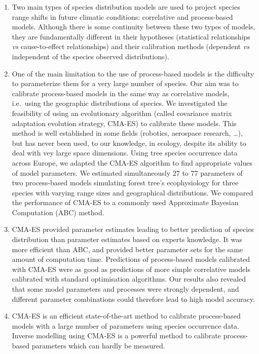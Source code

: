 \documentclass[11pt,]{article}
\renewenvironment{abstract}
 {{%
    \setlength{\leftmargin}{0mm}
    \setlength{\rightmargin}{\leftmargin}%
  }%
  \relax}
 {\endlist}
\begin{document}
\begin{abstract}

    \hbox{\vrule height .2pt width 39.14pc}

    \vskip 8.5pt %

\noindent \begin{enumerate}
\def\labelenumi{\arabic{enumi}.}
\item
  Two main types of species distribution models are used to project
  species range shifts in future climatic conditions: correlative and
  process-based models. Although there is some continuity between these
  two types of models, they are fundamentally different in their
  hypotheses (statistical relationships \emph{vs} cause-to-effect
  relationships) and their calibration methods (dependent \emph{vs}
  independent of the species observed distributions).
\item
  One of the main limitation to the use of process-based models is the
  difficulty to parameterize them for a very large number of species.
  Our aim was to calibrate process-based models in the same way as
  correlative models, i.e.~using the geographic distributions of
  species. We investigated the feasibility of using an evolutionary
  algorithm (called covariance matrix adaptation evolution strategy,
  CMA-ES) to calibrate these models. This method is well established in
  some fields (robotics, aerospace research, \ldots), but has never been
  used, to our knowledge, in ecology, despite its ability to deal with
  vey large space dimensions. Using tree species occurrence data across
  Europe, we adapted the CMA-ES algorithm to find appropriate values of
  model parameters. We estimated simultaneously 27 to 77 parameters of
  two process-based models simulating forest tree's ecophysiology for
  three species with varying range sizes and geographical distributions.
  We compared the performance of CMA-ES to a commonly used Approximate
  Bayesian Computation (ABC) method.
\item
  CMA-ES provided parameter estimates leading to better prediction of
  species distribution than parameter estimates based on experts
  knowledge. It was more efficient than ABC, and provided better
  parameter sets for the same amount of computation time. Predictions of
  process-based models calibrated with CMA-ES were as good as
  predictions of more simple correlative models calibrated with standard
  optimisation algorithms. Our results also revealed that some model
  parameters and processes were strongly dependent, and different
  parameter combinations could therefore lead to high model accuracy.
\item
  CMA-ES is an efficient state-of-the-art method to calibrate
  process-based models with a large number of parameters using species
  occurrence data. Inverse modelling using CMA-ES is a powerful method
  to calibrate process-based parameters which can hardly be measured.
\end{enumerate}



\end{abstract}
\end{document}
